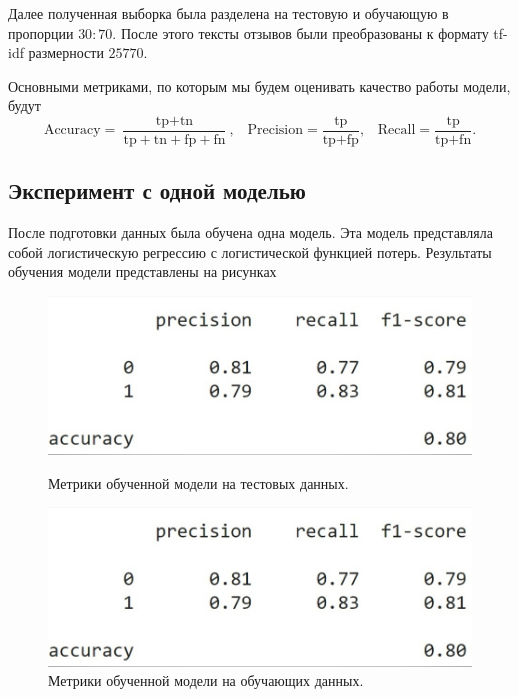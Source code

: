 \documentclass[12pt, twoside]{article}
\begin{document}
Далее полученная выборка была разделена на тестовую и обучающую в пропорции $30:70$. После этого тексты отзывов были преобразованы к формату tf-idf размерности $25770$.

Основными метриками, по которым мы будем оценивать качество работы модели, будут
\[\text{Accuracy} = \frac{\text{tp} + \text{tn}}{\text{tp} + \text{tn} + \text{fp}+ \text{fn}}, \hspace{10pt} \text{Precision} = \frac{\text{tp}}{\text{tp} + \text{fp}}, \hspace{10pt} \text{Recall} = \frac{\text{tp}}{\text{tp} + \text{fn}}.\]


\subsection{Эксперимент с одной моделью}
После подготовки данных была обучена одна модель. Эта модель представляла собой логистическую регрессию с логистической функцией потерь. Результаты обучения модели представлены на рисунках
\begin{figure}[h]
\begin{center}
\begin{minipage}[h]{0.4\linewidth}
\includegraphics[width=1\linewidth]{fig/res.jpg}
\caption{Метрики обученной модели на тестовых данных.} %
\end{minipage}
\hfill
\begin{minipage}[h]{0.4\linewidth}
\includegraphics[width=1\linewidth]{fig/res.jpg}
\caption{Метрики обученной модели на обучающих данных.}
\end{minipage}
\end{center}
\end{figure}
 
\end{document}
